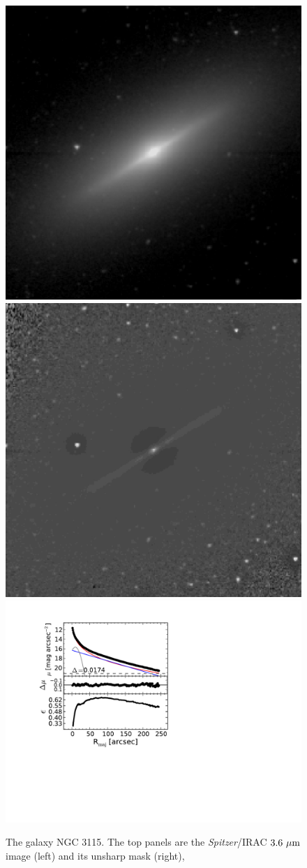 \documentclass[useAMS,usenatbib,article]{mn2e}
\begin{document}
\begin{figure}
\begin{center}
\includegraphics[width=0.49\columnwidth]{images/n3115_image.jpeg}
\includegraphics[width=0.49\columnwidth]{images/n3115_unsharp.jpeg} \\
\includegraphics[width=1.05\columnwidth]{images/n3115_decomposition.pdf}
\caption{The galaxy NGC 3115. 
The top panels are the \emph{Spitzer}/IRAC $3.6~\rm \mu m$ image (left) and its unsharp mask (right), 
}
\end{center}
\end{figure}
\end{document}
